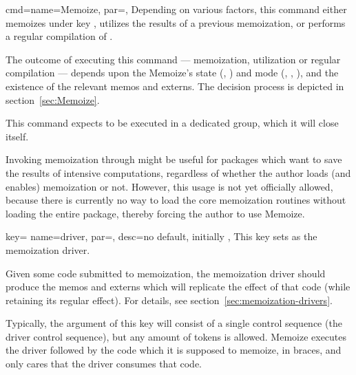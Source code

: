 \documentclass[a4paper,11pt]{article}
\begin{document}
\begin{doc}{
    cmd={name=Memoize, par=},
  }
  Depending on various factors, this command either memoizes  under
  key , utilizes the results of a previous memoization, or performs a
  regular compilation of .

  The outcome of executing this command --- memoization, utilization or regular
  compilation --- depends upon the Memoize's state (,
  ) and mode (, ,
  ), and the existence of the relevant memos and externs.
  The decision process is depicted in section~\ref{sec:Memoize}.

  This command expects to be executed in a dedicated group, which it will close
  itself.

  Invoking memoization through  might be useful for packages
  which want to save the results of intensive computations, regardless of
  whether the author loads (and enables) memoization or not.  However, this
  usage is not yet officially allowed, because there is currently no way to
  load the core memoization routines without loading the entire package,
  thereby forcing the author to use Memoize.
\end{doc}

\begin{doc}{
    key={
      name=driver, par=,
      desc={no default, initially }
    },
  }
  This key sets  as the memoization driver.

  Given some code submitted to memoization, the memoization driver should
  produce the memos and externs which will replicate the effect of that code
  (while retaining its regular effect).  For details, see
  section~\ref{sec:memoization-drivers}.

  Typically, the  argument of this key will consist of a single
  control sequence (the driver control sequence), but any amount of tokens is
  allowed.  Memoize executes the driver followed by the code which it is
  supposed to memoize, in braces, and only cares that the driver consumes that
  code.
\end{doc}
\end{document}

